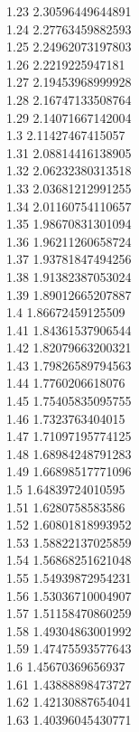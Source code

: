{1.23	2.30596449644891\\
1.24	2.27763459882593\\
1.25	2.24962073197803\\
1.26	2.2219225947181\\
1.27	2.19453968999928\\
1.28	2.16747133508764\\
1.29	2.14071667142004\\
1.3	2.11427467415057\\
1.31	2.08814416138905\\
1.32	2.06232380313518\\
1.33	2.03681212991255\\
1.34	2.01160754110657\\
1.35	1.98670831301094\\
1.36	1.96211260658724\\
1.37	1.93781847494256\\
1.38	1.91382387053024\\
1.39	1.89012665207887\\
1.4	1.86672459125509\\
1.41	1.84361537906544\\
1.42	1.82079663200321\\
1.43	1.79826589794563\\
1.44	1.7760206618076\\
1.45	1.75405835095755\\
1.46	1.7323763404015\\
1.47	1.71097195774125\\
1.48	1.68984248791283\\
1.49	1.66898517771096\\
1.5	1.64839724010595\\
1.51	1.6280758583586\\
1.52	1.60801818993952\\
1.53	1.58822137025859\\
1.54	1.56868251621048\\
1.55	1.54939872954231\\
1.56	1.53036710004907\\
1.57	1.51158470860259\\
1.58	1.49304863001992\\
1.59	1.47475593577643\\
1.6	1.45670369656937\\
1.61	1.43888898473727\\
1.62	1.42130887654041\\
1.63	1.40396045430771\\
}
